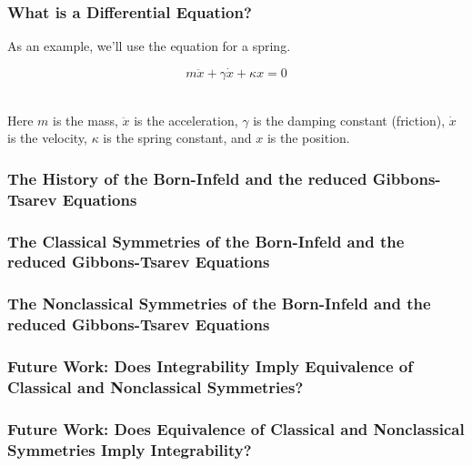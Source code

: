 \documentclass{beamer}
\begin{document}
\begin{frame}
    \frametitle{What is a Differential Equation?}
    As an example, we'll use the equation for a spring.\\
    \vspace*{0.125in}
    \begin{Large}
        $$m\ddot{x}+\gamma\dot{x}+\kappa{x}=0$$
    \end{Large}
    \vspace*{0.25in}
    \\Here $m$ is the mass, $\ddot{x}$ is the acceleration, $\gamma$ is the damping constant (friction), $\dot{x}$ is the velocity, $\kappa$ is the spring constant, and $x$ is the position.
\end{frame}


\begin{frame}
    \frametitle{The History of the Born-Infeld and the reduced Gibbons-Tsarev Equations}

\end{frame}



\begin{frame}
    \frametitle{The Classical Symmetries of the Born-Infeld and the reduced Gibbons-Tsarev Equations}

\end{frame}



\begin{frame}
    \frametitle{The Nonclassical Symmetries of the Born-Infeld and the reduced Gibbons-Tsarev Equations}

\end{frame}



\begin{frame}
    \frametitle{Future Work: Does Integrability Imply Equivalence of Classical and Nonclassical Symmetries?}

\end{frame}



\begin{frame}
    \frametitle{Future Work: Does Equivalence of Classical and Nonclassical Symmetries Imply Integrability?}

\end{frame}
\end{document}
